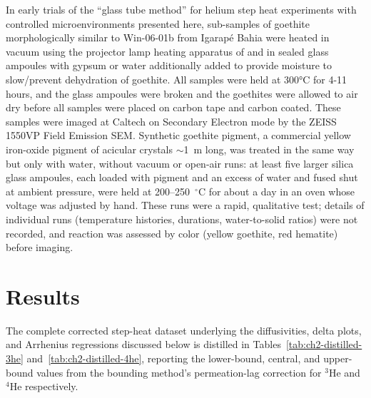 In early trials of the ``glass tube method'' for helium step heat
experiments with controlled microenvironments presented here,
sub-samples of goethite morphologically similar to Win-06-01b from
Igarapé Bahia \citep{shustervasconcelos2005,monteiro2017} were heated in
vacuum using the projector lamp heating apparatus of \citet{farley1999}
and in sealed glass ampoules with gypsum or water additionally added to
provide moisture to slow/prevent dehydration of goethite. All samples
were held at 300°C for 4-11 hours, and the glass ampoules were broken
and the goethites were allowed to air dry before all samples were placed
on carbon tape and carbon coated. These samples were imaged at Caltech
on Secondary Electron mode by the ZEISS 1550VP Field Emission SEM.
Synthetic goethite pigment, a commercial yellow iron-oxide pigment of acicular crystals
$\sim$1~\textmu m long, was treated in the same way but only with water, without vacuum or
open-air runs: at least five larger silica glass ampoules, each loaded with pigment and an excess
of water and fused shut at ambient pressure, were held at 200--250~$^\circ$C for about a day in an
oven whose voltage was adjusted by hand. These runs were a rapid, qualitative test; details of
individual runs (temperature histories, durations, water-to-solid ratios) were not recorded, and
reaction was assessed by color (yellow goethite, red hematite) before imaging.

\section{\texorpdfstring{Results }{Results }}\label{ch2-results}

The complete corrected step-heat dataset underlying the diffusivities, delta plots, and Arrhenius regressions discussed below is distilled in Tables~\ref{tab:ch2-distilled-3he} and~\ref{tab:ch2-distilled-4he}, reporting the lower-bound, central, and upper-bound values from the bounding method's permeation-lag correction for $^3$He and $^4$He respectively.

